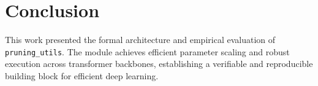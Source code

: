\section{Conclusion}
This work presented the formal architecture and empirical evaluation of \texttt{pruning_utils}. The module achieves efficient parameter scaling and robust execution across transformer backbones, establishing a verifiable and reproducible building block for efficient deep learning.
